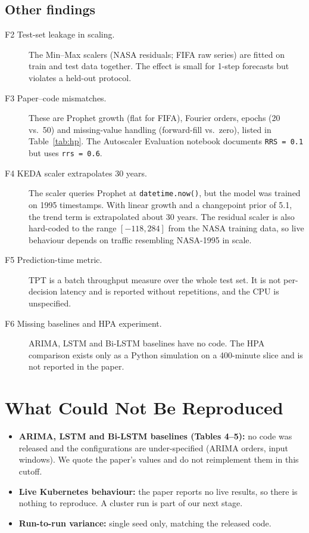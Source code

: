 \documentclass[11pt,a4paper]{article}
\begin{document}
\subsection{Other findings}
\begin{description}
\item[F2 Test-set leakage in scaling.] The Min--Max scalers (NASA residuals; FIFA raw series) are fitted on train and test data together. The effect is small for 1-step forecasts but violates a held-out protocol.
\item[F3 Paper--code mismatches.] These are Prophet growth (flat for FIFA), Fourier orders, epochs (20 vs.\ 50) and missing-value handling (forward-fill vs.\ zero), listed in Table~\ref{tab:hp}. The Autoscaler Evaluation notebook documents \texttt{RRS = 0.1} but uses \texttt{rrs = 0.6}.
\item[F4 KEDA scaler extrapolates 30 years.] The scaler queries Prophet at \texttt{datetime.now()}, but the model was trained on 1995 timestamps. With linear growth and a changepoint prior of 5.1, the trend term is extrapolated about 30 years. The residual scaler is also hard-coded to the range $[-118, 284]$ from the NASA training data, so live behaviour depends on traffic resembling NASA-1995 in scale.
\item[F5 Prediction-time metric.] TPT is a batch throughput measure over the whole test set. It is not per-decision latency and is reported without repetitions, and the CPU is unspecified.
\item[F6 Missing baselines and HPA experiment.] ARIMA, LSTM and Bi-LSTM baselines have no code. The HPA comparison exists only as a Python simulation on a 400-minute slice and is not reported in the paper.
\end{description}

\section{What Could Not Be Reproduced}\label{sec:notrepro}
\begin{itemize}
\item \textbf{ARIMA, LSTM and Bi-LSTM baselines (Tables 4--5):} no code was released and the configurations are under-specified (ARIMA orders, input windows). We quote the paper's values and do not reimplement them in this cutoff.
\item \textbf{Live Kubernetes behaviour:} the paper reports no live results, so there is nothing to reproduce. A cluster run is part of our next stage.
\item \textbf{Run-to-run variance:} single seed only, matching the released code.
\end{itemize}
\end{document}
